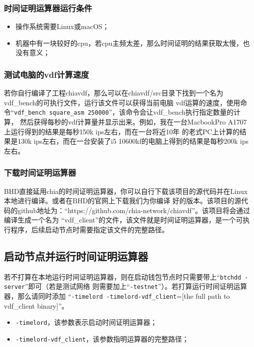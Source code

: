 \subsubsection{时间证明运算器运行条件}
\begin{itemize}
    \item 操作系统需要Linux或macOS；
    \item 机器中有一块较好的cpu，若cpu主频太差，那么时间证明的结果获取太慢，也没有意义；
\end{itemize}
\subsubsection{测试电脑的vdf计算速度}
\begin{flushleft}
    若你自行编译了工程chiavdf，那么可以在chiavdf/src目录下找到一个名为vdf\_bench的可执行文件，运行该文件可以获得当前电脑
    vdf运算的速度，使用命令``\texttt{vdf_bench square_asm 250000}''，该命令会让vdf\_bench执行指定数量的计算，
    然后获得每秒的vdf计算量并显示出来。例如，我在一台MacbookPro A1707上运行得到的结果是每秒150k ips左右，而在一台将近10年
    的老式PC上计算的结果是130k ips左右，而在一台安装了i5 10600kf的电脑上得到的结果是每秒200k ips左右。
\end{flushleft}
\subsubsection{下载时间证明运算器}
\begin{flushleft}
    BHD直接延用chia的时间证明运算器，你可以自行下载该项目的源代码并在Linux本地进行编译。或者在BHD的官网上下载我们为你编译
    好的版本。该项目的源代码的github地址为：``https://github.com/chia-network/chiavdf''。该项目将会通过编译生成一个名为
    ``vdf\_client''的文件，该文件就是时间证明运算器，是一个可执行程序，后续启动节点时需要指定该文件的完整路径。
\end{flushleft}
\subsection{启动节点并运行时间证明运算器}
\begin{flushleft}
    若不打算在本地运行时间证明运算器，则在启动钱包节点时只需要带上``\texttt{btchdd -server}''即可（若是测试网络
    则需要加上``\texttt{-testnet}''）。若打算运行时间证明运算器，那么请同时添加
    ``\texttt{-timelord -timelord-vdf_client}=[the full path to vdf\_client binary]''。
\end{flushleft}
\begin{itemize}
    \item \texttt{-timelord}，该参数表示启动时间证明运算器；
    \item \texttt{-timelord-vdf_client}，该参数指明运算器的完整路径；
\end{itemize}
